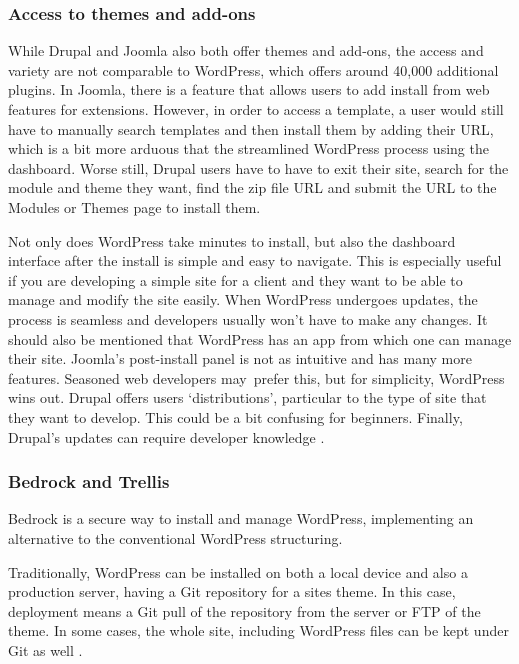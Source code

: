 \hypertarget{access-to-themes-and-add-ons}{%
\subsubsection{Access to themes and
add-ons~}\label{access-to-themes-and-add-ons}}

While Drupal and Joomla also both offer themes and add-ons, the access
and variety are not comparable to WordPress, which offers around 40,000
additional plugins. In Joomla, there is a feature that allows users to
add install from web features for extensions. However, in order to
access a template, a user would still have to manually search templates
and then install them by adding their URL, which is a bit more arduous
that the streamlined WordPress process using the dashboard. Worse still,
Drupal users have to have to exit their site, search for the module and
theme they want, find the zip file URL and submit the URL to the Modules
or Themes page to install them.~

Not only does WordPress take minutes to install, but also the dashboard
interface after the install is simple and easy to navigate. This is
especially useful if you are developing a simple site for a client and
they want to be able to manage and modify the site easily. When
WordPress undergoes updates, the process is seamless and developers
usually won't have to make any changes. It should also be mentioned that
WordPress has an app from which one can manage their site. Joomla's
post-install panel is not as intuitive and has many more features.
Seasoned web developers may~prefer this, but for simplicity, WordPress
wins out. Drupal offers users `distributions', particular to the type of
site that they want to develop. This could be a bit confusing for
beginners. Finally, Drupal's updates can require developer knowledge
\cite{p2} \cite{p3} \cite{p4} .

\hypertarget{bedrock-and-trellis}{%
\subsubsection{Bedrock and Trellis}\label{bedrock-and-trellis}}

Bedrock is a secure way to install and manage WordPress, implementing an
alternative to the conventional WordPress structuring.

Traditionally, WordPress can be installed on both a local device and
also a production server, having a Git repository for a sites theme. In
this case, deployment means a Git pull of the repository from the server
or FTP of the theme. In some cases, the whole site, including WordPress
files can be kept under Git as well \cite{p6} .

